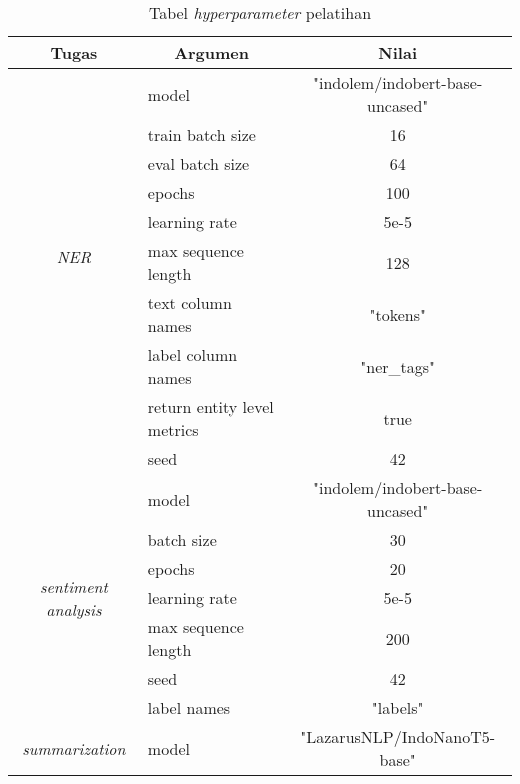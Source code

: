 \begin{table}[h]
    \centering
    \caption{Tabel \textit{hyperparameter} pelatihan}
    \label{table:hyperparameter-train}
    \begin{tabular}{|c|l|c|}
        \hline \rowcolor{black!10}
        \textbf{Tugas} & \multicolumn{1}{|c|}{\textbf{Argumen}} & \textbf{Nilai} \\ \hline
        \multirow{9}{*}{\textit{NER}} & model & "indolem/indobert-base-uncased" \\ \cline{2-3}
                                      & train batch size & 16 \\ \cline{2-3}
                                      & eval batch size & 64 \\ \cline{2-3}
                                      & epochs & 100 \\ \cline{2-3}
                                      & learning rate & 5e-5 \\ \cline{2-3}
                                      & max sequence length & 128 \\ \cline{2-3}
                                      & text column names & "tokens" \\ \cline{2-3}
                                      & label column names & "ner\_tags" \\ \cline{2-3}
                                      & return entity level metrics & true \\ \cline{2-3}
                                      & seed & 42 \\ \hline
        \multirow{7}{*}{\textit{sentiment analysis}} & model & "indolem/indobert-base-uncased" \\ \cline{2-3}
                                                     & batch size & 30 \\ \cline{2-3}
                                                     & epochs & 20 \\ \cline{2-3}
                                                     & learning rate & 5e-5 \\ \cline{2-3}
                                                     & max sequence length & 200 \\ \cline{2-3}
                                                     & seed & 42 \\ \cline{2-3}
                                                     & label names & "labels" \\ \hline
        \multirow{14}{*}{\textit{summarization}} & model & "LazarusNLP/IndoNanoT5-base" \\ \cline{2-3}

\end{tabular}
\end{table}

